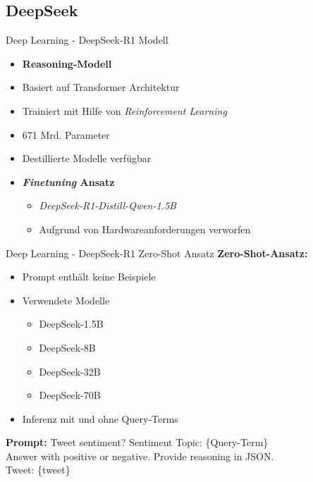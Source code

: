 \documentclass[aspectratio=169]{beamer}
\begin{document}
\subsection{DeepSeek}

\begin{frame}{Deep Learning - DeepSeek-R1 Modell}
	\begin{itemize}
		\item \textbf{Reasoning-Modell}
		\item Basiert auf Transformer Architektur
		\item Trainiert mit Hilfe von \textit{Reinforcement Learning}
		\item 671 Mrd. Parameter
		\item Destillierte Modelle verfügbar
	\end{itemize}
	\vspace{0.4cm}

	\begin{itemize}
		\item \textbf{\textit{Finetuning} Ansatz}
		      \begin{itemize}
			      \item \textit{DeepSeek-R1-Distill-Qwen-1.5B}
			      \item Aufgrund von Hardwareanforderungen verworfen
		      \end{itemize}
	\end{itemize}
\end{frame}

\begin{frame}{Deep Learning - DeepSeek-R1 Zero-Shot Ansatz}
	\textbf{Zero-Shot-Ansatz:}

	\vspace{0.35cm}

	\begin{itemize}
		\item Prompt enthält keine Beispiele
		\item Verwendete Modelle
		      \begin{itemize}
			      \item DeepSeek-1.5B
			      \item DeepSeek-8B
			      \item DeepSeek-32B
			      \item DeepSeek-70B
		      \end{itemize}
		\item Inferenz mit und ohne Query-Terms
	\end{itemize}
	\vspace{0.2cm}
	\centering
	\textbf{Prompt:} Tweet sentiment? Sentiment Topic: \{Query-Term\} \\
	Answer with positive or negative. Provide reasoning in JSON.\\
	Tweet: \glqq\{tweet\}\grqq
\end{frame}
\end{document}
